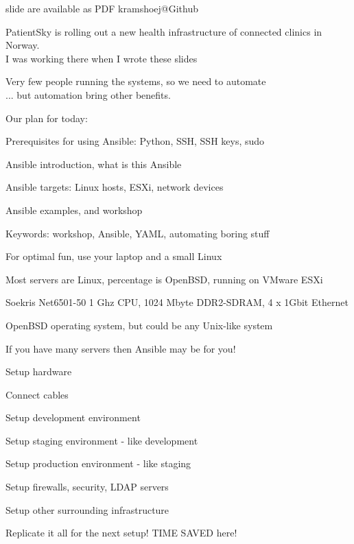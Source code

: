 \documentclass[18pt,landscape,a4paper,footrule]{foils}
\begin{document}


\vskip 1cm
\centerline{\footnotesize slide are available as PDF kramshoej@Github}


PatientSky is rolling out a new health infrastructure of connected clinics in Norway. \\
I was working there when I wrote these slides \smiley

Very few people running the systems, so we need to automate\\
... but automation bring other benefits.

Our plan for today:
\begin{list2}
\item Prerequisites for using Ansible: Python, SSH, SSH keys, sudo
\item Ansible introduction, what is this Ansible
\item Ansible targets: Linux hosts, ESXi, network devices
\item Ansible examples, and workshop
\item Keywords: workshop, Ansible, YAML, automating boring stuff
\end{list2}

\centerline{For optimal fun, use your laptop and a small Linux}




Most servers are Linux, percentage is OpenBSD, running on VMware ESXi



\begin{list2}
\item Soekris Net6501-50 1 Ghz CPU, 1024 Mbyte DDR2-SDRAM, 4 x 1Gbit Ethernet
\item OpenBSD operating system, but could be any Unix-like system
\item If you have many servers then Ansible may be for you!
\end{list2}



\begin{list2}
\item Setup hardware
\item Connect cables
\vskip 1cm
\item Setup development environment
\item Setup staging environment - like development
\item Setup production environment - like staging
\item Setup firewalls, security, LDAP servers
\item Setup other surrounding infrastructure
\item Replicate it all for the next setup! TIME SAVED here!
\end{list2}
\end{document}
